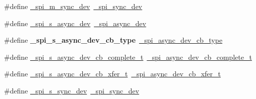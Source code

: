 \begin{DoxyCompactItemize}
\#define \hyperlink{group__hpl__spi_ga7674622aeda62f2981f106e2d8221a5e}{\+\_\+spi\+\_\+m\+\_\+sync\+\_\+dev}~\hyperlink{struct__spi__sync__dev}{\+\_\+spi\+\_\+sync\+\_\+dev}
\item 
\#define \hyperlink{group__hpl__spi_ga7ac9e8d408bc498841e8e461ad8656aa}{\+\_\+spi\+\_\+s\+\_\+async\+\_\+dev}~\hyperlink{struct__spi__async__dev}{\+\_\+spi\+\_\+async\+\_\+dev}
\item 
\mbox{\label{group__hpl__spi_gae620b9ec00192d2ac574fc6a9d963f00}} 
\#define {\bfseries \+\_\+spi\+\_\+s\+\_\+async\+\_\+dev\+\_\+cb\+\_\+type}~\hyperlink{group__hpl__spi_ga0f0c72bc59abef8035904e8e267dfde9}{\+\_\+spi\+\_\+async\+\_\+dev\+\_\+cb\+\_\+type}
\item 
\#define \hyperlink{group__hpl__spi_ga756808e81e5dab8f583b37c4c7cfef8f}{\+\_\+spi\+\_\+s\+\_\+async\+\_\+dev\+\_\+cb\+\_\+complete\+\_\+t}~\hyperlink{group__hpl__spi_ga446094494e8aacbf4ad1a74c868d9809}{\+\_\+spi\+\_\+async\+\_\+dev\+\_\+cb\+\_\+complete\+\_\+t}
\item 
\#define \hyperlink{group__hpl__spi_ga584d088d30604fde430c5f3f9af1e19a}{\+\_\+spi\+\_\+s\+\_\+async\+\_\+dev\+\_\+cb\+\_\+xfer\+\_\+t}~\hyperlink{group__hpl__spi_ga62275ef9b2c245ed2ed183f9d1c98a31}{\+\_\+spi\+\_\+async\+\_\+dev\+\_\+cb\+\_\+xfer\+\_\+t}
\item 
\#define \hyperlink{group__hpl__spi_ga36cf082f9d7764b69f43a52f039e7165}{\+\_\+spi\+\_\+s\+\_\+sync\+\_\+dev}~\hyperlink{struct__spi__sync__dev}{\+\_\+spi\+\_\+sync\+\_\+dev}
\end{DoxyCompactItemize}
